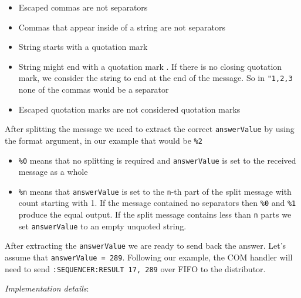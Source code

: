 \begin{itemize}
{{\begin{itemize}
				\item Escaped commas \highlight{\textbackslash ,} are not separators
				\item Commas that appear inside of a string are not separators
				\item String starts with a quotation mark 
				\item String might end with a quotation mark . If there is no closing quotation mark, we consider the string to end at the end of the message. So in \texttt{"1,2,3} none of the commas would be a separator
				\item Escaped quotation marks  are not considered quotation marks
			\end{itemize}
		}
		\item{
			After splitting the message we need to extract the correct \texttt{answerValue} by using the format argument, in our example that would be \texttt{\%2}
			\begin{itemize}
				\item \texttt{\%0} means that no splitting is required and \texttt{answerValue} is set to the received message as a whole
				\item \texttt{\%n} means that \texttt{answerValue} is set to the \texttt{n}-th part of the split message with count starting with 1. If the message contained no separators then \texttt{\%0} and \texttt{\%1} produce the equal output. If the split message contains less than \texttt{n} parts we set \texttt{answerValue} to an empty unquoted string.
			\end{itemize}
		}
		\item After extracting the \texttt{answerValue} we are ready to send back the answer. Let's assume that \texttt{answerValue = 289}. Following our example, the COM handler will need to send \texttt{:SEQUENCER:RESULT 17, 289} over FIFO to the distributor.
	}
\end{itemize}

\textit{Implementation details}:

